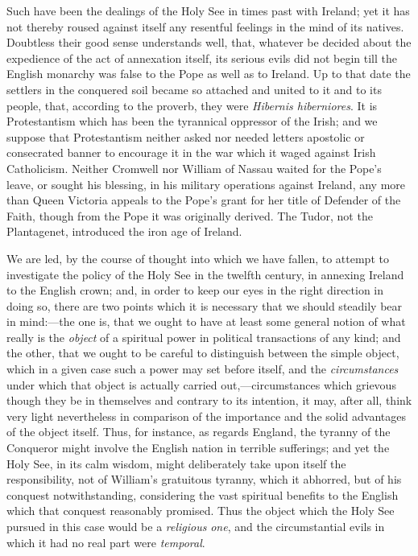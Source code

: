 Such have been the dealings of
the Holy See in times past with Ireland; yet it has not thereby roused
against itself any resentful feelings in the mind of its natives.
Doubtless their good sense understands well, that, whatever be decided
about the expedience of the act of annexation itself, its serious
evils did not begin till the English monarchy was false to the Pope as
well as to Ireland. Up to that date the settlers in the conquered soil
became so attached and united to it and to its people, that, according
to the proverb, they were \emph{Hibernis hiberniores}. It is
Protestantism which has been the tyrannical oppressor of the Irish;
and we suppose that Protestantism neither asked nor needed letters
apostolic or consecrated banner to encourage it in the war which it
waged against Irish Catholicism. Neither Cromwell nor William of Nassau waited for the Pope's leave, or sought his blessing, in his
military operations against Ireland, any more than Queen Victoria
appeals to the Pope's grant for her title of Defender of the Faith,
though from the Pope it was originally derived. The Tudor, not the
Plantagenet, introduced the iron age of Ireland.

We are led, by the course of
thought into which we have fallen, to attempt to investigate the
policy of the Holy See in the twelfth century, in annexing Ireland to
the English crown; and, in order to keep our eyes in the right
direction in doing so, there are two points which it is necessary that
we should steadily bear in mind:—the one is, that we ought to have
at least some general notion of what really is the \emph{object} of a
spiritual power in political transactions of any kind; and the other,
that we ought to be careful to distinguish between the simple object,
which in a given case such a power may set before itself, and the \emph{circumstances}
under which that object is actually carried out,—circumstances which
grievous though they be in themselves and contrary to its intention,
it may, after all, think very light nevertheless in comparison of the
importance and the solid advantages of the object itself. Thus, for
instance, as regards England, the tyranny of the Conqueror might
involve the English nation in terrible sufferings; and yet the Holy
See, in its calm wisdom, might deliberately take upon itself the
responsibility, not of William's gratuitous tyranny, which it
abhorred, but of his conquest notwithstanding, considering the vast
spiritual benefits to the English which that conquest reasonably
promised. Thus the object which the Holy See pursued in this case
would be a \emph{religious} \emph{one}, and the circumstantial evils
in which it had no real part were \emph{temporal}.


